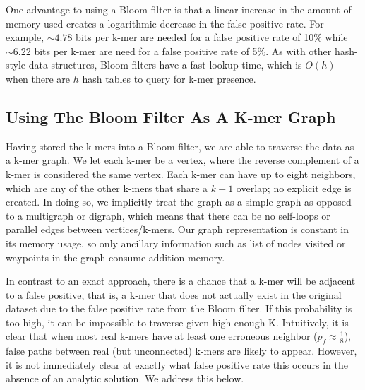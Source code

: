 \documentclass[12pt]{article} \usepackage{simplemargins}
\begin{document}
One advantage to
using a Bloom filter is that a linear increase in the amount of memory
used creates a logarithmic decrease in the false positive
rate. For example, $\sim4.78$ bits per k-mer are needed for a false
positive rate of 10\% while $\sim6.22$ bits per k-mer are need for a false
positive rate of
5\%. As with other hash-style data structures, Bloom filters have a
fast lookup time, which is $O(h)$ when there are $h$ hash tables to query
for k-mer presence. 

\subsection{Using The Bloom Filter As A K-mer Graph}
Having stored the k-mers into a Bloom filter, we are able to traverse
the data as a k-mer graph. We let each k-mer be a vertex, where
the reverse complement of a k-mer is considered the same
vertex. Each k-mer can
have up to eight neighbors, which are any of the other k-mers that
 share a $k-1$ 
overlap; no explicit edge is created. In doing so, we implicitly treat the graph as a simple graph as opposed
to a multigraph or digraph, which means that there can be no
self-loops or parallel edges between vertices/k-mers. Our graph representation is 
constant in its memory usage, so only ancillary information such as list of 
nodes visited or waypoints in the graph consume addition memory.
 
In contrast to an exact
approach, there is a chance that a k-mer will be adjacent to a false positive,
that is, a k-mer
that does not actually exist in the original dataset due to the false
positive rate from the Bloom filter. If this probability is too high,
it can be impossible to traverse given high enough K.
Intuitively, it is clear that when most real k-mers 
have at least one erroneous neighbor ($p_f \approx \frac{1}{8}$), false paths 
between real (but unconnected) k-mers are likely to appear. However, it is not immediately clear 
at exactly what false positive rate this occurs in the absence of an analytic 
solution.  We address this below.  %
\end{document}
